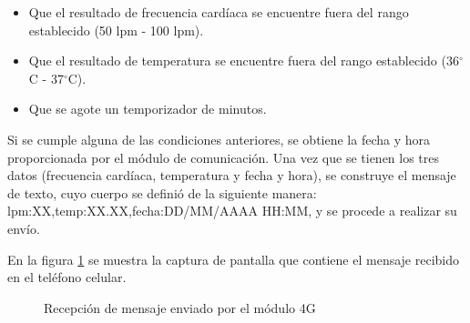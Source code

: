	
\begin{itemize}
	\item Que el resultado de frecuencia cardíaca se encuentre fuera del rango establecido (50 lpm - 100 lpm).
	\item Que el resultado de temperatura se encuentre fuera del rango establecido (36$^{\circ}$C - 37$^{\circ}$C).
	\item Que se agote un temporizador de minutos.
\end{itemize}

Si se cumple alguna de las condiciones anteriores, se obtiene la fecha y hora proporcionada por el módulo de comunicación. Una vez que se tienen los tres datos (frecuencia cardíaca, temperatura y fecha y hora), se construye el mensaje de texto, cuyo cuerpo se definió de la siguiente manera: lpm:{XX},temp:{XX.XX},fecha:{DD/MM/AAAA HH:MM}, y se procede a realizar su envío.

En la figura \ref{fig:RecepcionMsj} se muestra la captura de pantalla que contiene el mensaje recibido en el teléfono celular.\\

\begin{figure}[htbp!]
	\centering
	\caption{Recepción de mensaje enviado por el módulo 4G}
	\label{fig:RecepcionMsj}
\end{figure}
	
\clearpage